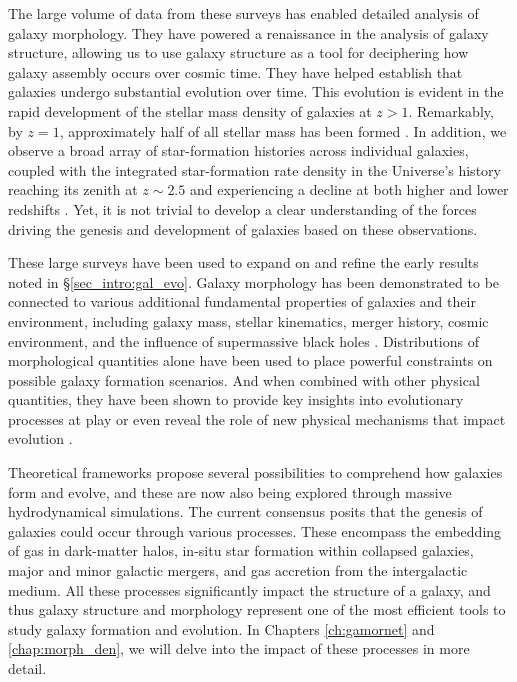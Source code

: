 The large volume of data from these surveys has enabled detailed analysis of galaxy morphology. They have powered a renaissance in the analysis of galaxy structure, allowing us to use galaxy structure as a tool for deciphering how galaxy assembly occurs over cosmic time. They have helped establish that galaxies undergo substantial evolution over time. This evolution is evident in the rapid development of the stellar mass density of galaxies at $z > 1$. Remarkably, by $z = 1$, approximately half of all stellar mass has been formed \citep[e.g.,][]{bundy_05,mortlock_11}. In addition, we observe a broad array of star-formation histories across individual galaxies, coupled with the integrated star-formation rate density in the Universe's history reaching its zenith at $z \sim 2.5$ and experiencing a decline at both higher and lower redshifts \citep[e.g.,][]{shapely_11, madau_dickinson_14}. Yet, it is not trivial to develop  a clear understanding of the forces driving the genesis and development of galaxies based on these observations. 

These large surveys have been used to expand on and refine the early results noted in \S \ref{sec_intro:gal_evo}. Galaxy morphology has been demonstrated to be connected to various additional fundamental properties of galaxies and their environment, including galaxy mass, stellar kinematics, merger history, cosmic environment, and the influence of supermassive black holes \citep[e.g.,][]{Tremaine2002TheCorrelation, pozzetti_10, wuyts_11, Huertas-Company2016MassCANDELS,powell_17, shimakawa_2021, Dimauro2022CoincidenceGrowth}. Distributions of morphological quantities alone have been used to place powerful constraints on possible galaxy formation scenarios. And when combined with other physical quantities, they have been shown to provide key insights into evolutionary processes at play or even reveal the role of new physical  mechanisms that impact evolution \citep[e.g.,][]{Kauffmann2004TheGalaxies,Weinmann2006PropertiesMass,Schawinski2007TheGalaxies,vanderWel2008TheMass,Schawinski2014TheGalaxies}.

Theoretical frameworks propose several possibilities to comprehend how galaxies form and evolve, and these are now also being explored through massive hydrodynamical simulations. The current consensus posits that the genesis of galaxies could occur through various processes. These encompass the embedding of gas in dark-matter halos, in-situ star formation within collapsed galaxies, major and minor galactic mergers, and gas accretion from the intergalactic medium. All these processes significantly impact the structure of a galaxy, and thus galaxy structure and morphology represent one of the most efficient tools to study galaxy formation and evolution. In Chapters \ref{ch:gamornet} and \ref{chap:morph_den}, we will delve into the impact of these processes in more detail. 

